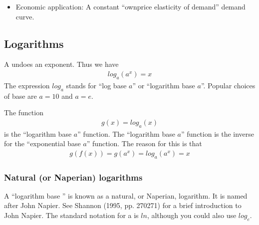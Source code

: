 \documentclass[letterpaper,10pt,english]{jupyterBook}
\begin{document}
\sphinxAtStartPar
{}
\begin{itemize}
\item {} 
\sphinxAtStartPar
Economic application: A constant “own\sphinxhyphen{}price elasticity of demand” demand curve.

\end{itemize}


\subsection{Logarithms}
\label{\detokenize{03.mappings_functions_correspondences:logarithms}}
\sphinxAtStartPar
A  undoes an exponent.
Thus we have
\begin{equation*}
\begin{split}
log_a (a^x) = x
\end{split}
\end{equation*}
\sphinxAtStartPar
The expression \(log_a\) stands for “log base \(a\)” or “logarithm base \(a\)”. Popular choices of base are \(a = 10\) and \(a = e\).

\sphinxAtStartPar
The function
\begin{equation*}
\begin{split}
g(x) = log_a(x)
\end{split}
\end{equation*}
\sphinxAtStartPar
is the “logarithm base \(a\)” function. The “logarithm base \(a\)” function is the inverse for the “exponential base \(a\)” function. The reason for this is that
\begin{equation*}
\begin{split}
g(f(x)) = g(a^x) = log_a(a^x) = x
\end{split}
\end{equation*}

\subsubsection{Natural (or Naperian) logarithms}
\label{\detokenize{03.mappings_functions_correspondences:natural-or-naperian-logarithms}}
\sphinxAtStartPar
A “logarithm base ” is known as a natural, or Naperian, logarithm. It is named after John Napier. See Shannon (1995, pp. 270\sphinxhyphen{}271) for a brief introduction to John Napier. The standard notation for a  is \(ln\), although you could also use \(log_e\).
\end{document}

